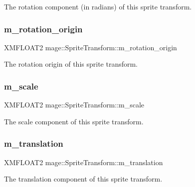 The rotation component (in radians) of this sprite transform. \hypertarget{structmage_1_1_sprite_transform_ae51ebd0226ef4b569b6a66884823bd18}{}\label{structmage_1_1_sprite_transform_ae51ebd0226ef4b569b6a66884823bd18} 
\subsubsection{\texorpdfstring{m\+\_\+rotation\+\_\+origin}{m\_rotation\_origin}}
{\footnotesize\ttfamily X\+M\+F\+L\+O\+A\+T2 mage\+::\+Sprite\+Transform\+::m\+\_\+rotation\+\_\+origin\hspace{0.3cm}{\ttfamily [private]}}

The rotation origin of this sprite transform. \hypertarget{structmage_1_1_sprite_transform_a7532d4d41d02b5fa6f31eeb4fd4fd886}{}\label{structmage_1_1_sprite_transform_a7532d4d41d02b5fa6f31eeb4fd4fd886} 
\subsubsection{\texorpdfstring{m\+\_\+scale}{m\_scale}}
{\footnotesize\ttfamily X\+M\+F\+L\+O\+A\+T2 mage\+::\+Sprite\+Transform\+::m\+\_\+scale\hspace{0.3cm}{\ttfamily [private]}}

The scale component of this sprite transform. \hypertarget{structmage_1_1_sprite_transform_a7642907ec8ae9685bb7c56675607045b}{}\label{structmage_1_1_sprite_transform_a7642907ec8ae9685bb7c56675607045b} 
\subsubsection{\texorpdfstring{m\+\_\+translation}{m\_translation}}
{\footnotesize\ttfamily X\+M\+F\+L\+O\+A\+T2 mage\+::\+Sprite\+Transform\+::m\+\_\+translation\hspace{0.3cm}{\ttfamily [private]}}

The translation component of this sprite transform. 